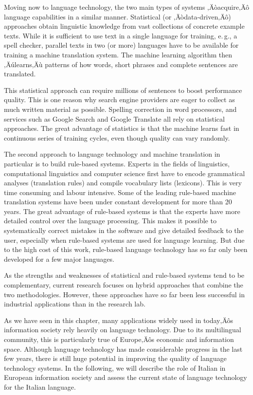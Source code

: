 \begin{multicols}{2}
Moving now to language technology, the two main types of systems ‚Äòacquire‚Äô
language capabilities in a similar manner. Statistical (or ‚Äòdata-driven‚Äô)
approaches obtain linguistic knowledge from vast collections of concrete
example texts. While it is sufficient to use text in a single language for
training, e.\,g., a spell checker, parallel texts in two (or more) languages
have to be available for training a machine translation system. The machine
learning algorithm then ‚Äúlearns‚Äù patterns of how words, short phrases and
complete sentences are translated. 

This statistical approach can require millions of sentences to boost
performance quality. This is one reason why
search engine providers are eager to collect as much written material as
possible. Spelling correction in word processors, and services such as Google
Search and Google Translate all rely on statistical approaches. The great
advantage of statistics is that the machine learns fast in continuous series
of training cycles, even though quality can vary randomly.

The second approach to language technology and machine translation in
particular is to build rule-based systems. Experts in the fields of
linguistics, computational linguistics and computer science first have to
encode grammatical analyses (translation rules) and compile vocabulary lists
(lexicons). This is very time consuming and labour intensive. Some of the
leading rule-based machine translation systems have been under constant
development for more than 20 years. The great advantage of rule-based
systems is that the experts have more detailed control over the language
processing. This makes it possible to systematically correct mistakes in the
software and give detailed feedback to the user, especially when rule-based
systems are used for language learning. But due to the high cost of this work,
rule-based language technology has so far only been developed for a few major
languages. 


As the strengths and weaknesses of statistical and rule-based systems tend to
be complementary, current research focuses on hybrid approaches that combine
the two methodologies. However, these approaches have so far been less
successful in industrial applications than in the research lab. 

As we have seen in this chapter, many applications widely used in today‚Äôs
information society rely heavily on language technology. Due to its
multilingual community, this is particularly true of Europe‚Äôs economic and
information space. Although language technology has made considerable progress
in the last few years, there is still huge potential in improving the quality
of language technology systems. In the following, we will describe the role of
Italian in European information society and assess the current state of
language technology for the Italian language.


\end{multicols}

